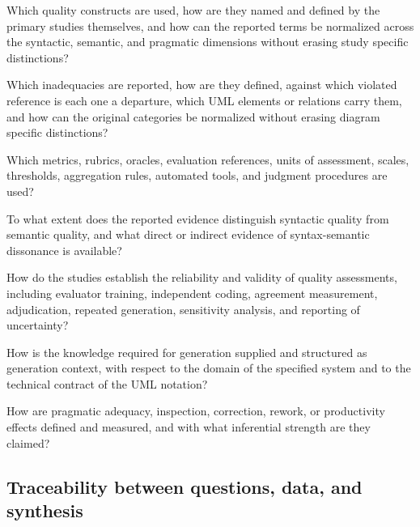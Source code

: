 \begin{description}[style=nextline,leftmargin=2.0cm,labelwidth=1.5cm]
    \item[SQ1.] Which quality constructs are used, how are they named and defined by the primary studies themselves, and how can the reported terms be normalized across the syntactic, semantic, and pragmatic dimensions without erasing study specific distinctions?
    \item[SQ2.] Which inadequacies are reported, how are they defined, against which violated reference is each one a departure, which UML elements or relations carry them, and how can the original categories be normalized without erasing diagram specific distinctions?
    \item[SQ3.] Which metrics, rubrics, oracles, evaluation references, units of assessment, scales, thresholds, aggregation rules, automated tools, and judgment procedures are used?
    \item[SQ4.] To what extent does the reported evidence distinguish syntactic quality from semantic quality, and what direct or indirect evidence of syntax-semantic dissonance is available?
    \item[SQ5.] How do the studies establish the reliability and validity of quality assessments, including evaluator training, independent coding, agreement measurement, adjudication, repeated generation, sensitivity analysis, and reporting of uncertainty?
    \item[SQ6.] How is the knowledge required for generation supplied and structured as generation context, with respect to the domain of the specified system and to the technical contract of the UML notation?
    \item[SQ7.] How are pragmatic adequacy, inspection, correction, rework, or productivity effects defined and measured, and with what inferential strength are they claimed?
\end{description}

\subsection{Traceability between questions, data, and synthesis}

